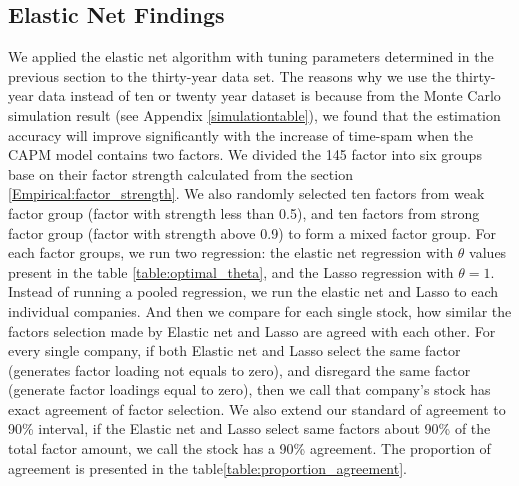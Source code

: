 \subsection{Elastic Net Findings}
We applied the elastic net algorithm with tuning parameters determined in the previous section to the thirty-year data set.
The reasons why we use the thirty-year data instead of ten or twenty year dataset is because from the Monte Carlo simulation result (see Appendix \ref{simulationtable}), we found that the estimation accuracy will improve significantly with the increase of time-spam when the CAPM model contains two factors.
We divided the 145 factor into six groups base on their factor strength calculated from the section \ref{Empirical:factor_strength}.
We also randomly selected ten factors from  weak factor group (factor with strength less than 0.5), and ten factors from strong factor group (factor with strength above 0.9) to form a mixed factor group.
For each factor groups, we run two regression: the elastic net regression with $\theta$ values present in the table \ref{table:optimal_theta}, and the Lasso regression with $\theta = 1$.
Instead of running a pooled regression, we run the elastic net and Lasso to each individual companies.
And then we compare for each single stock, how similar the factors selection made by Elastic net and Lasso are agreed with each other.
For every single company, if both Elastic net and Lasso select the same factor (generates factor loading not equals to zero), and disregard the same factor (generate factor loadings equal to zero), then we call that company's stock has exact agreement of factor selection.
We also extend our standard of agreement to 90\% interval, if the Elastic net and Lasso select same factors about 90\% of the total factor amount, we call the stock has a 90\% agreement.
The proportion of agreement is presented in the table\ref{table:proportion_agreement}.

